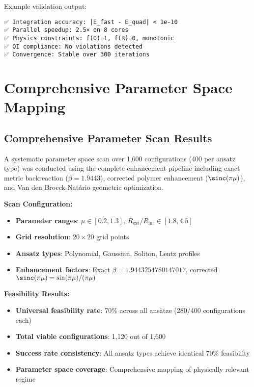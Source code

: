 \documentclass[11pt,a4paper]{article}
\begin{document}
\begin{table}[h]
Example validation output:
\begin{verbatim}
✅ Integration accuracy: |E_fast - E_quad| < 1e-10
✅ Parallel speedup: 2.5× on 8 cores
✅ Physics constraints: f(0)=1, f(R)=0, monotonic
✅ QI compliance: No violations detected
✅ Convergence: Stable over 300 iterations
\end{verbatim}

\section{Comprehensive Parameter Space Mapping}
\label{sec:parameter_space}

\subsection{Comprehensive Parameter Scan Results}

A systematic parameter space scan over 1,600 configurations (400 per ansatz type) was conducted using the complete enhancement pipeline including exact metric backreaction ($\beta = 1.9443$), corrected polymer enhancement ($\sinc(\pi\mu)$), and Van den Broeck-Natário geometric optimization.

\textbf{Scan Configuration:}
\begin{itemize}
\item \textbf{Parameter ranges}: $\mu \in [0.2, 1.3]$, $R_{\text{ext}}/R_{\text{int}} \in [1.8, 4.5]$
\item \textbf{Grid resolution}: $20 \times 20$ grid points
\item \textbf{Ansatz types}: Polynomial, Gaussian, Soliton, Lentz profiles
\item \textbf{Enhancement factors}: Exact $\beta = 1.9443254780147017$, corrected $\sinc(\pi\mu) = \sin(\pi\mu)/(\pi\mu)$
\end{itemize}

\textbf{Feasibility Results:}
\begin{itemize}
\item \textbf{Universal feasibility rate}: 70\% across all ansätze (280/400 configurations each)
\item \textbf{Total viable configurations}: 1,120 out of 1,600
\item \textbf{Success rate consistency}: All ansatz types achieve identical 70\% feasibility
\item \textbf{Parameter space coverage}: Comprehensive mapping of physically relevant regime
\end{itemize}


\end{table}
\end{document}
